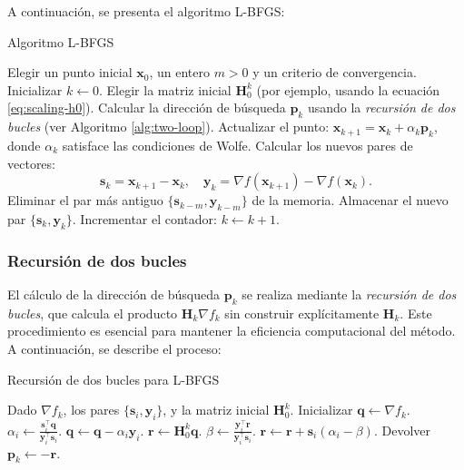 A continuación, se presenta el algoritmo L-BFGS:

\begin{algorithm}[H]
\caption{Algoritmo L-BFGS}
\label{alg:l-bfgs-formal}
\begin{algorithmic}[1]
\STATE Elegir un punto inicial $\mathbf{x}_0$, un entero $m > 0$ y un criterio de convergencia.
\STATE Inicializar $k \gets 0$.
\REPEAT
    \STATE Elegir la matriz inicial $\mathbf{H}_0^k$ (por ejemplo, usando la ecuación \eqref{eq:scaling-h0}).
    \STATE Calcular la dirección de búsqueda $\mathbf{p}_k$ usando la \textit{recursión de dos bucles} (ver Algoritmo \ref{alg:two-loop}).
    \STATE Actualizar el punto: $\mathbf{x}_{k+1} = \mathbf{x}_k + \alpha_k \mathbf{p}_k$, donde $\alpha_k$ satisface las condiciones de Wolfe.
    \STATE Calcular los nuevos pares de vectores:
    \[
    \mathbf{s}_k = \mathbf{x}_{k+1} - \mathbf{x}_k, \quad \mathbf{y}_k = \nabla f(\mathbf{x}_{k+1}) - \nabla f(\mathbf{x}_k).
    \]
        \STATE Eliminar el par más antiguo $\{\mathbf{s}_{k-m}, \mathbf{y}_{k-m}\}$ de la memoria.
    \ENDIF
    \STATE Almacenar el nuevo par $\{\mathbf{s}_k, \mathbf{y}_k\}$.
    \STATE Incrementar el contador: $k \gets k + 1$.
\end{algorithmic}
\end{algorithm}

\subsubsection{Recursión de dos bucles}

El cálculo de la dirección de búsqueda $\mathbf{p}_k$ se realiza mediante la \textit{recursión de dos bucles}, que calcula el producto $\mathbf{H}_k \nabla f_k$ sin construir explícitamente $\mathbf{H}_k$. Este procedimiento es esencial para mantener la eficiencia computacional del método. A continuación, se describe el proceso:

\begin{algorithm}[H]
\caption{Recursión de dos bucles para L-BFGS}
\label{alg:two-loop}
\begin{algorithmic}[1]
\STATE Dado $\nabla f_k$, los pares $\{\mathbf{s}_i, \mathbf{y}_i\}$, y la matriz inicial $\mathbf{H}_0^k$.
\STATE Inicializar $\mathbf{q} \gets \nabla f_k$.
    \STATE $\alpha_i \gets \frac{\mathbf{s}_i^\top \mathbf{q}}{\mathbf{y}_i^\top \mathbf{s}_i}$.
    \STATE $\mathbf{q} \gets \mathbf{q} - \alpha_i \mathbf{y}_i$.
\ENDFOR
\STATE $\mathbf{r} \gets \mathbf{H}_0^k \mathbf{q}$.
    \STATE $\beta \gets \frac{\mathbf{y}_i^\top \mathbf{r}}{\mathbf{y}_i^\top \mathbf{s}_i}$.
    \STATE $\mathbf{r} \gets \mathbf{r} + \mathbf{s}_i (\alpha_i - \beta)$.
\ENDFOR
\STATE Devolver $\mathbf{p}_k \gets -\mathbf{r}$.
\end{algorithmic}
\end{algorithm}

